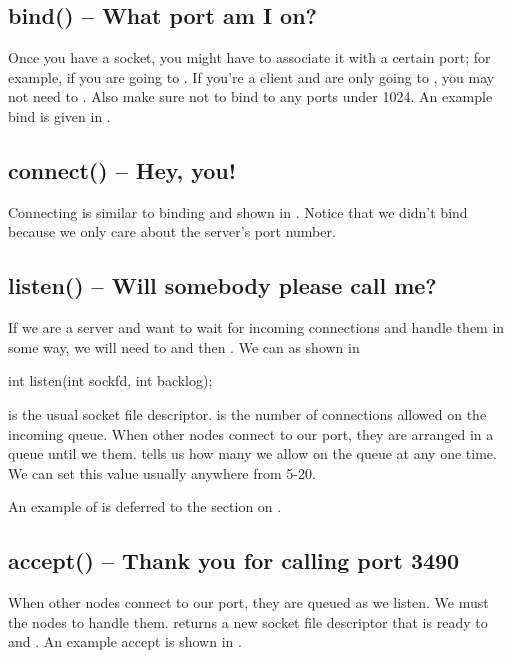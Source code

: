 
\subsection{bind() -- What port am I on?}
Once you have a socket, you might have to associate it with a certain port; for example, if you are going to . If you're a client and are only going to , you may not need to . Also make sure not to bind to any ports under 1024. An example bind is given in .


\subsection{connect() -- Hey, you!}
Connecting is similar to binding and shown in . Notice that we didn't bind because we only care about the server's port number.


\subsection{listen() -- Will somebody please call me?}
If we are a server and want to wait for incoming connections and handle them in some way, we will need to  and then . We can  as shown in 

\begin{CPP}[label=list:listen,caption=listen API]
int listen(int sockfd, int backlog);
\end{CPP}

 is the usual socket file descriptor.  is the number of connections allowed on the incoming queue. When other nodes connect to our port, they are arranged in a queue until we  them.  tells us how many we allow on the queue at any one time. We can set this value usually anywhere from 5-20.

An example of  is deferred to the section on .

\subsection{accept() -- Thank you for calling port 3490}
When other nodes connect to our port, they are queued as we listen. We must  the nodes to handle them.  returns a new socket file descriptor that is ready to  and . An example accept is shown in .

